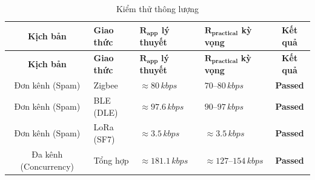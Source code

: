         \begin{longtable}{|c|p{}|p{}|p{}|c|}
            \caption{Kiểm thử thông lượng}
            \label{tab:test_throughput} \\
            \hline
            \textbf{Kịch bản} & \textbf{Giao thức} & $\boldsymbol{R_{app}}$ \textbf{lý thuyết} & $\boldsymbol{R_{practical}}$ \textbf{kỳ vọng} & \textbf{Kết quả} \\ \hline
            \endfirsthead
            \hline
            \textbf{Kịch bản} & \textbf{Giao thức} & $\boldsymbol{R_{app}}$ \textbf{lý thuyết} & $\boldsymbol{R_{practical}}$ \textbf{kỳ vọng} & \textbf{Kết quả} \\ \hline
            \endhead
            \hline
            \endfoot
            \endlastfoot
        
            Đơn kênh (Spam) & Zigbee & $\approx 80\,kbps$ & $70$--$80\,kbps$ & \textcolor{modern_blue}{\textbf{Passed}} \\ \hline
            Đơn kênh (Spam) & BLE (DLE) & $\approx 97.6\,kbps$ & $90$--$97\,kbps$ & \textcolor{modern_blue}{\textbf{Passed}} \\ \hline
            Đơn kênh (Spam) & LoRa (SF7) & $\approx 3.5\,kbps$ & $\approx 3.5\,kbps$ & \textcolor{modern_blue}{\textbf{Passed}} \\ \hline
            Đa kênh (Concurrency) & Tổng hợp & $\approx 181.1\,kbps$ & $\approx 127$--$154\,kbps$ & \textcolor{modern_blue}{\textbf{Passed}} \\ \hline
        \end{longtable}